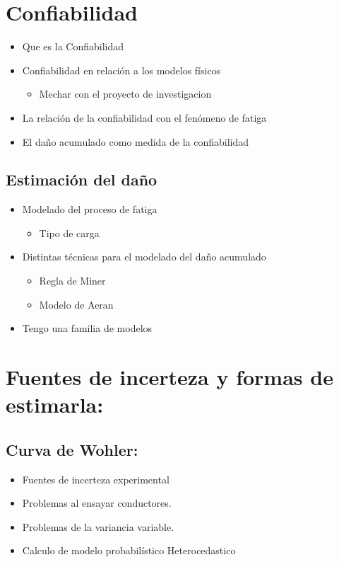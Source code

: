 \documentclass[11pt]{article}
\begin{document}
\section{Confiabilidad}
\label{sec:org8749d57}
\begin{itemize}
\item Que es la Confiabilidad
\item Confiabilidad en relación a los modelos físicos
\begin{itemize}
\item Mechar con el proyecto de investigacion
\end{itemize}
\item La relación de la confiabilidad con el fenómeno de fatiga
\item El daño acumulado como medida de la confiabilidad
\end{itemize}
\subsection{Estimación del daño}
\label{sec:org14a3beb}
\begin{itemize}
\item Modelado del proceso de fatiga
\begin{itemize}
\item Tipo de carga
\end{itemize}
\item Distintas técnicas para el modelado del daño acumulado
\begin{itemize}
\item Regla de Miner
\item Modelo de Aeran
\end{itemize}
\item Tengo una familia de modelos
\end{itemize}
\section{Fuentes de incerteza y formas de estimarla:}
\label{sec:org1197d19}
\subsection{Curva de Wohler:}
\label{sec:orgbff497f}
\begin{itemize}
\item Fuentes de incerteza experimental
\item Problemas al ensayar conductores.
\item Problemas de la variancia variable.
\item Calculo de modelo probabilístico Heterocedastico
\end{itemize}
\end{document}
